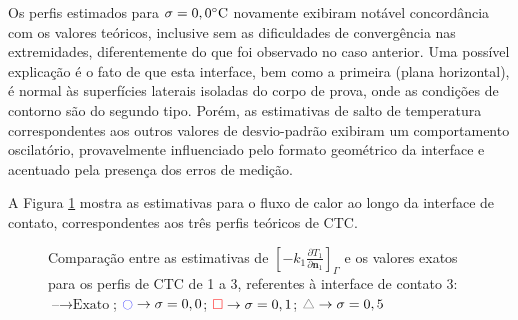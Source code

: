 Os perfis estimados para $\sigma = 0,0\celsius$ novamente exibiram notável concordância com os valores teóricos, inclusive sem as dificuldades de convergência nas extremidades, diferentemente do que foi observado no caso anterior. Uma possível explicação é o fato de que esta interface, bem como a primeira (plana horizontal), é normal às superfícies laterais isoladas do corpo de prova, onde as condições de contorno são do segundo tipo. Porém, as estimativas de salto de temperatura correspondentes aos outros valores de desvio-padrão exibiram um comportamento oscilatório, provavelmente influenciado pelo formato geométrico da interface e acentuado pela presença dos erros de medição.
%
%

A Figura \ref{figura_fluxo_calor_interface_03} mostra as estimativas para o fluxo de calor ao longo da interface de contato, correspondentes aos três perfis teóricos de CTC.

\begin{figure}[H]
	\caption{Comparação entre as estimativas de $\left[-k_1 \frac{\partial T_1}{\partial\mathbf{n}_1}\right]_\Gamma$ e os valores exatos para os perfis de CTC de 1 a 3, referentes à interface de contato 3: $\text{--} \rightarrow \text{Exato}$; $\textcolor{blue}{\ocircle} \rightarrow \sigma = 0,0$; $\textcolor{red}{\square} \rightarrow \sigma = 0,1$; $\textcolor{gray}{\triangle} \rightarrow \sigma = 0,5$}
	\label{figura_fluxo_calor_interface_03}
\end{figure}

